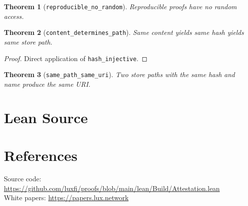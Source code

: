 \documentclass[11pt]{article}
\newtheorem{theorem}{Theorem}
\begin{document}
\begin{theorem}[\texttt{reproducible\_no\_random}]
Reproducible proofs have no random access.
\end{theorem}

\begin{theorem}[\texttt{content\_determines\_path}]
Same content yields same hash yields same store path.
\end{theorem}
\begin{proof}
Direct application of \texttt{hash\_injective}.
\end{proof}

\begin{theorem}[\texttt{same\_path\_same\_uri}]
Two store paths with the same hash and name produce the same URI.
\end{theorem}


\section{Lean Source}


\section{References}
\noindent Source code: \url{https://github.com/luxfi/proofs/blob/main/lean/Build/Attestation.lean}\\
\noindent White papers: \url{https://papers.lux.network}
\end{document}
